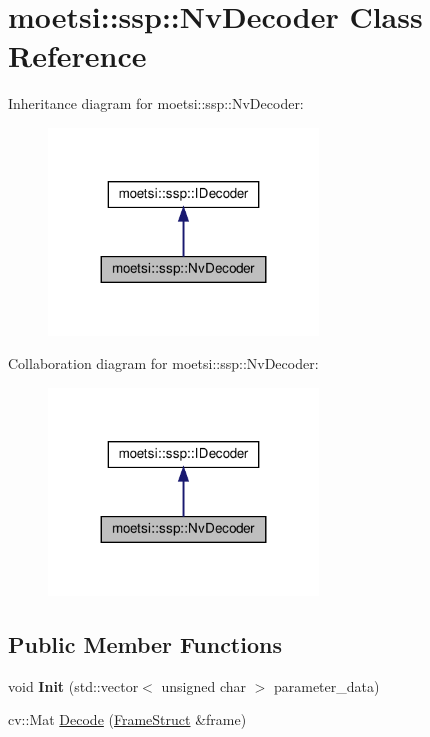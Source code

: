 \hypertarget{classmoetsi_1_1ssp_1_1NvDecoder}{}\section{moetsi\+:\+:ssp\+:\+:Nv\+Decoder Class Reference}
\label{classmoetsi_1_1ssp_1_1NvDecoder}


Inheritance diagram for moetsi\+:\+:ssp\+:\+:Nv\+Decoder\+:
\nopagebreak
\begin{figure}[H]
\begin{center}
\leavevmode
\includegraphics[width=203pt]{classmoetsi_1_1ssp_1_1NvDecoder__inherit__graph}
\end{center}
\end{figure}


Collaboration diagram for moetsi\+:\+:ssp\+:\+:Nv\+Decoder\+:
\nopagebreak
\begin{figure}[H]
\begin{center}
\leavevmode
\includegraphics[width=203pt]{classmoetsi_1_1ssp_1_1NvDecoder__coll__graph}
\end{center}
\end{figure}
\subsection*{Public Member Functions}
\begin{DoxyCompactItemize}
\item 
\mbox{\label{classmoetsi_1_1ssp_1_1NvDecoder_a004e8a1ed5618df951477c9bb955b6ec}} 
void {\bfseries Init} (std\+::vector$<$ unsigned char $>$ parameter\+\_\+data)
\item 
cv\+::\+Mat \hyperlink{classmoetsi_1_1ssp_1_1NvDecoder_a78eb894b6825ac5ec57f5a4f4ecd7e31}{Decode} (\hyperlink{structmoetsi_1_1ssp_1_1FrameStruct}{Frame\+Struct} \&frame)
\end{DoxyCompactItemize}


